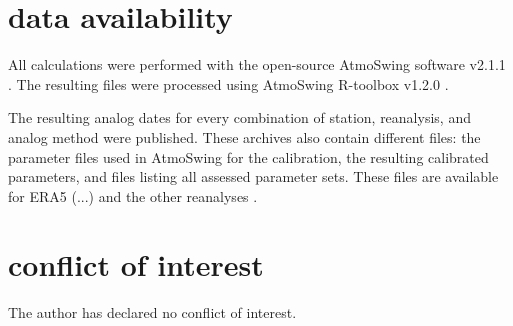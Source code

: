 \documentclass[alpha-refs]{wiley-article}
\begin{document}
\section*{data availability}
All calculations were performed with the open-source AtmoSwing software v2.1.1 \citep{Horton2019c}. The resulting files were processed using AtmoSwing R-toolbox v1.2.0 \citep{Horton2018d}.

The resulting analog dates for every combination of station, reanalysis, and analog method were published. These archives also contain different files: the parameter files used in AtmoSwing for the calibration, the resulting calibrated parameters, and files listing all assessed parameter sets. These files are available for ERA5 (...) and the other reanalyses \citep[see references in][]{Horton2018b}.



\section*{conflict of interest}
The author has declared no conflict of interest.










\end{document}
